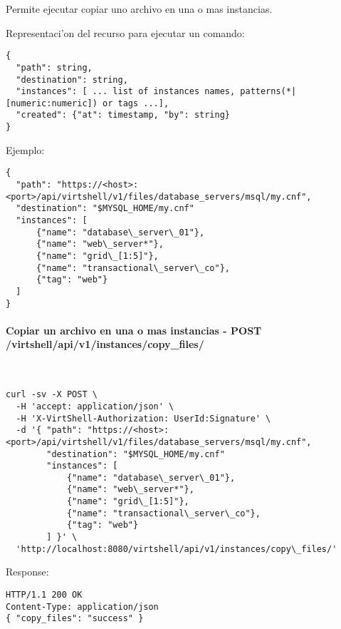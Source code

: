 Permite ejecutar copiar uno archivo en una o mas instancias.

Representaci'on del recurso para ejecutar un comando:

\medskip
\begin{lstlisting}[style=json]
{
  "path": string,
  "destination": string,
  "instances": [ ... list of instances names, patterns(*|[numeric:numeric]) or tags ...],
  "created": {"at": timestamp, "by": string}
}
\end{lstlisting}

Ejemplo:

\medskip
\begin{lstlisting}[style=json]
{
  "path": "https://<host>:<port>/api/virtshell/v1/files/database_servers/msql/my.cnf",
  "destination": "$MYSQL_HOME/my.cnf"
  "instances": [
      {"name": "database\_server\_01"},
      {"name": "web\_server*"},
      {"name": "grid\_[1:5]"},
      {"name": "transactional\_server\_co"},
      {"tag": "web"}
  ]
}
\end{lstlisting}

\paragraph{Copiar un archivo en una o mas instancias - POST /virtshell/api/v1/instances/copy\_files/} ~\\

\begin{lstlisting}[style=json]
curl -sv -X POST \
  -H 'accept: application/json' \
  -H 'X-VirtShell-Authorization: UserId:Signature' \
  -d '{ "path": "https://<host>:<port>/api/virtshell/v1/files/database_servers/msql/my.cnf",
        "destination": "$MYSQL_HOME/my.cnf"
        "instances": [
            {"name": "database\_server\_01"},
            {"name": "web\_server*"},
            {"name": "grid\_[1:5]"},
            {"name": "transactional\_server\_co"},
            {"tag": "web"}
        ] }' \
  'http://localhost:8080/virtshell/api/v1/instances/copy\_files/'
\end{lstlisting}

Response:

\begin{lstlisting}[style=json]
HTTP/1.1 200 OK
Content-Type: application/json
{ "copy_files": "success" }
\end{lstlisting}
